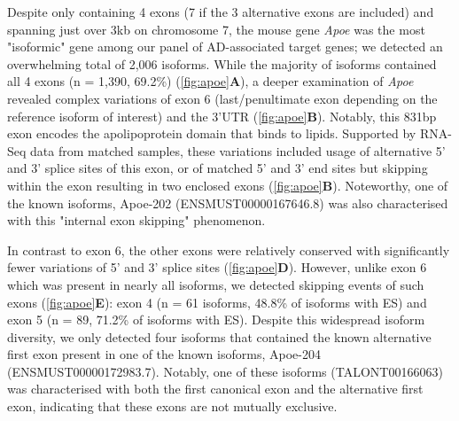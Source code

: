Despite only containing 4 exons (7 if the 3 alternative exons are included) and spanning just over 3kb on chromosome 7, the mouse gene \textit{Apoe} was the most "isoformic" gene among our panel of AD-associated target genes; we detected an overwhelming total of 2,006 isoforms. While the majority of isoforms contained all 4 exons (n = 1,390, 69.2\%) (\cref{fig:apoe}\textbf{A}), a deeper examination of \textit{Apoe} revealed complex variations of exon 6 (last/penultimate exon depending on the reference isoform of interest) and the 3'UTR (\cref{fig:apoe}\textbf{B}). Notably, this 831bp exon encodes the apolipoprotein domain that binds to lipids.  Supported by RNA-Seq data from matched samples, these variations included usage of alternative 5' and 3' splice sites of this exon, or of matched 5' and 3' end sites but skipping within the exon resulting in two enclosed exons (\cref{fig:apoe}\textbf{B}). Noteworthy, one of the known isoforms, Apoe-202 (ENSMUST00000167646.8) was also characterised with this "internal exon skipping" phenomenon.

In contrast to exon 6, the other exons were relatively conserved with significantly fewer variations of 5' and 3' splice sites (\cref{fig:apoe}\textbf{D}). However, unlike exon 6 which was present in nearly all isoforms, we detected skipping events of such exons (\cref{fig:apoe}\textbf{E}): exon 4 (n = 61 isoforms, 48.8\% of isoforms with ES) and exon 5 (n = 89, 71.2\% of isoforms with ES). Despite this widespread isoform diversity, we only detected four isoforms that contained the known alternative first exon present in one of the known isoforms, Apoe-204 (ENSMUST00000172983.7). Notably, one of these isoforms (TALONT00166063) was characterised with both the first canonical exon and the alternative first exon, indicating that these exons are not mutually exclusive. 

